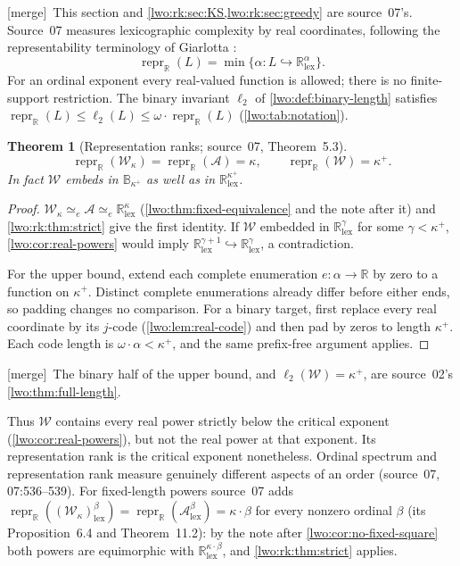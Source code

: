 \documentclass[11pt,a4paper]{article}
\newtheorem{theorem}{Theorem}[section]
\theoremstyle{definition}
\theoremstyle{remark}
\newcommand{\R}{\mathbb R}
\newcommand{\W}{\mathcal W}
\newcommand{\A}{\mathcal A}
\newcommand{\B}{\mathbb B}
\newcommand{\lex}{\mathrm{lex}}
\newcommand{\bl}{\ell_2}
\newcommand{\emb}{\hookrightarrow}
\newcommand{\equi}{\mathrel{\simeq_{\!e}}}
\newcommand{\repr}{\operatorname{repr}_{\R}}
\newcommand{\merge}{\textsf{[merge]}}
\begin{document}
\merge\ This section and \cref{lwo:rk:sec:KS,lwo:rk:sec:greedy} are
source~07's. Source~07 measures lexicographic complexity by real coordinates,
following the representability terminology of Giarlotta \cite{Giarlotta}:
\[
 \repr(L)=\min\{\alpha:L\emb\R^\alpha_{\lex}\}.
\]
For an ordinal exponent every real-valued function is allowed; there is no
finite-support restriction. The binary invariant $\bl$ of
\cref{lwo:def:binary-length} satisfies $\repr(L)\le\bl(L)\le\omega\cdot\repr(L)$
(\cref{lwo:tab:notation}).

\begin{theorem}[Representation ranks; source~07, Theorem~5.3]\label{lwo:rk:thm:ranks}
\[
 \repr(\W_\kappa)=\repr(\A)=\kappa,\qquad \repr(\W)=\kappa^+.
\]
In fact $\W$ embeds in $\B_{\kappa^+}$ as well as in $\R^{\kappa^+}_{\lex}$.
\end{theorem}
\begin{proof}
$\W_\kappa\equi\A\equi\R^\kappa_{\lex}$ (\cref{lwo:thm:fixed-equivalence} and
the note after it) and \cref{lwo:rk:thm:strict} give the first identity. If
$\W$ embedded in $\R^\gamma_{\lex}$ for some $\gamma<\kappa^+$,
\cref{lwo:cor:real-powers} would imply
$\R^{\gamma+1}_{\lex}\emb\R^\gamma_{\lex}$, a contradiction.

For the upper bound, extend each complete enumeration $e:\alpha\to\R$ by zero
to a function on $\kappa^+$. Distinct complete enumerations already differ
before either ends, so padding changes no comparison. For a binary target,
first replace every real coordinate by its $j$-code (\cref{lwo:lem:real-code})
and then pad by zeros to length $\kappa^+$. Each code length is
$\omega\cdot\alpha<\kappa^+$, and the same prefix-free argument applies.
\end{proof}
\merge\ The binary half of the upper bound, and $\bl(\W)=\kappa^+$, are
source~02's \cref{lwo:thm:full-length}.

Thus $\W$ contains every real power strictly below the critical exponent
(\cref{lwo:cor:real-powers}), but not the real power at that exponent. Its
representation rank is the critical exponent nonetheless. Ordinal spectrum and
representation rank measure genuinely different aspects of an order
(source~07, 07:536--539). For fixed-length powers source~07 adds
$\repr((\W_\kappa)^\beta_{\lex})=\repr(\A^\beta_{\lex})=\kappa\cdot\beta$ for
every nonzero ordinal $\beta$ (its Proposition~6.4 and Theorem~11.2): by the
note after \cref{lwo:cor:no-fixed-square} both powers are equimorphic with
$\R^{\kappa\cdot\beta}_{\lex}$, and \cref{lwo:rk:thm:strict} applies.
\end{document}
